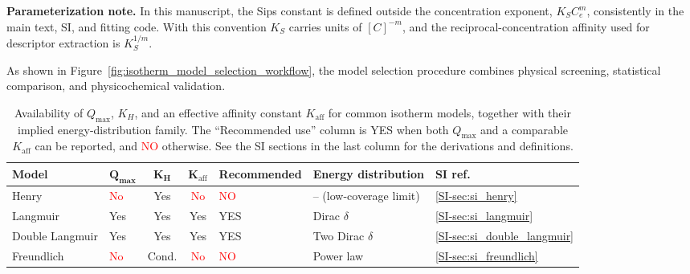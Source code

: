 \documentclass[journal=jacsat,manuscript=article]{achemso}
\begin{document}
	\begin{mdframed}
	\noindent\textbf{Parameterization note.}
	In this manuscript, the Sips constant is defined outside the concentration exponent, \(K_S C_e^m\), consistently in the main text, SI, and fitting code. With this convention \(K_S\) carries units of \([C]^{-m}\), and the reciprocal-concentration affinity used for descriptor extraction is \(K_S^{1/m}\).
	\end{mdframed}
	
	As shown in Figure~\ref{fig:isotherm_model_selection_workflow}, the model selection procedure combines physical screening, statistical comparison, and physicochemical validation.
	
	\newpage

	\begin{table}[H]
		\small
		\caption{Availability of $Q_{\max}$, $K_H$, and an effective affinity constant $K_{\mathrm{aff}}$ for common isotherm models, together with their implied energy-distribution family. The ``Recommended use'' column is \textcolor{green!50!black}{YES} when both $Q_{\max}$ and a comparable $K_{\mathrm{aff}}$ can be reported, and \textcolor{red}{NO} otherwise. See the SI sections in the last column for the derivations and definitions.}
		\label{tab:isotherm_availability}
		\renewcommand{\arraystretch}{1.2}
		\begin{tabular}{@{} p{2.0cm} p{1.0cm} c c p{3.0cm} p{3.8cm} p{1.8cm} @{}}
			\hline
			\textbf{Model}
			& $\boldsymbol{Q_{\max}}$
			& $\boldsymbol{K_H}$
			& $\boldsymbol{K_{\mathrm{aff}}}$
			& \textbf{Recommended}
			& \textbf{Energy distribution}
			& \textbf{SI ref.} \\
			\hline
			Henry
			& \textcolor{red}{No} & \textcolor{green!50!black}{Yes} & \textcolor{red}{No}
			& \textcolor{red}{NO}
			& -- (low-coverage limit)
			& \ref{SI-sec:si_henry} \\
			Langmuir
			& \textcolor{green!50!black}{Yes} & \textcolor{green!50!black}{Yes} & \textcolor{green!50!black}{Yes}
			& \textcolor{green!50!black}{YES}
			& Dirac $\delta$
			& \ref{SI-sec:si_langmuir} \\
			Double Langmuir
			& \textcolor{green!50!black}{Yes} & \textcolor{green!50!black}{Yes} & \textcolor{green!50!black}{Yes}
			& \textcolor{green!50!black}{YES}
			& Two Dirac $\delta$
			& \ref{SI-sec:si_double_langmuir} \\
			Freundlich
			& \textcolor{red}{No} & \textcolor{orange!80!black}{Cond.} & \textcolor{red}{No}
			& \textcolor{red}{NO}
			& Power law %
			& \ref{SI-sec:si_freundlich} \\

\end{tabular}
\end{table}
\end{document}
